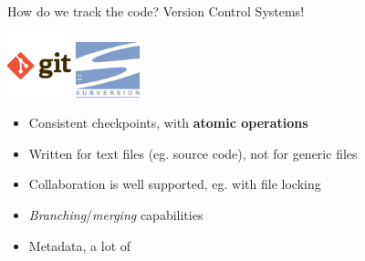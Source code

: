 \begin{frame}[fragile]{How do we track the code? Version Control Systems!}

\begin{center}
\includegraphics[width=5em]{git-logo}
\hspace{10em}
\includegraphics[width=5em]{subversion-logo}
\end{center}

\begin{itemize}
  \item Consistent checkpoints, with \textbf{atomic operations}
  \item Written for text files (eg. source code), not for generic files
  \item Collaboration is well supported, eg. with file locking
  \item \textit{Branching}/\textit{merging} capabilities
  \item Metadata, a lot of
\end{itemize}

\end{frame}
